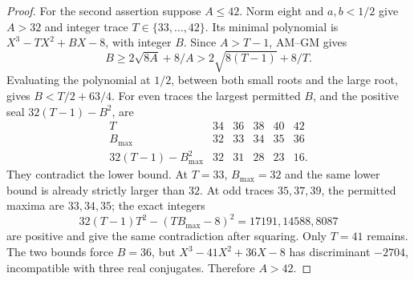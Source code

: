 \documentclass[11pt]{article}
\begin{document}
\begin{proof}
For the second assertion suppose $A\le42$. Norm eight and
$a,b<1/2$ give $A>32$ and integer trace $T\in\{33,\ldots,42\}$.
Its minimal polynomial is $X^3-TX^2+BX-8$, with integer $B$.
Since $A>T-1$, AM--GM gives
\[
 B\ge2\sqrt{8A}+8/A>2\sqrt{8(T-1)}+8/T.
\]
Evaluating the polynomial at $1/2$, between both small roots and
the large root, gives $B<T/2+63/4$.
For even traces the largest permitted $B$, and the positive seal
$32(T-1)-B^2$, are
\[
\begin{array}{c|rrrrr}
T&34&36&38&40&42\\\hline
B_{\max}&32&33&34&35&36\\
32(T-1)-B_{\max}^2&32&31&28&23&16.
\end{array}
\]
They contradict the lower bound. At $T=33$, $B_{\max}=32$ and
the same lower bound is already strictly larger than $32$.
At odd traces $35,37,39$, the permitted maxima are $33,34,35$;
the exact integers
\[
 32(T-1)T^2-(TB_{\max}-8)^2=17191,14588,8087
\]
are positive and give the same contradiction after squaring.
Only $T=41$ remains. The two bounds force $B=36$, but
$X^3-41X^2+36X-8$ has discriminant $-2704$, incompatible with
three real conjugates. Therefore $A>42$.
\end{proof}
\end{document}

